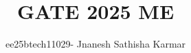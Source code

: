 \documentclass[journal]{IEEEtran}
\begin{document}

\vspace{3cm}


\title{GATE 2025 ME }
\author{ee25btech11029- Jnanesh Sathisha Karmar}
\maketitle
{\let\newpage\relax\maketitle}

\renewcommand{\thefigure}{\theenumi}
\renewcommand{\thetable}{\theenumi}
\setlength{\intextsep}{10pt} %
\end{document}
